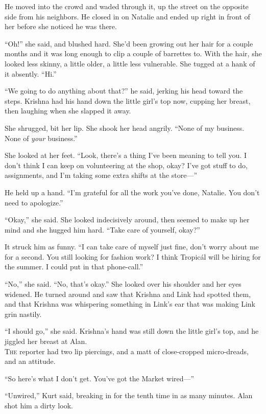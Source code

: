 \documentclass{article}
\begin{document}
He moved into the crowd and waded through it, up the street on the
opposite side from his neighbors.  He closed in on Natalie and ended
up right in front of her before she noticed he was there.

``Oh!'' she said, and blushed hard.  She'd been growing out her hair
for a couple months and it was long enough to clip a couple of
barrettes to.  With the hair, she looked less skinny, a little older,
a little less vulnerable.  She tugged at a hank of it absently. 
``Hi.''

``We going to do anything about that?'' he said, jerking his head
toward the steps.  Krishna had his hand down the little girl's top
now, cupping her breast, then laughing when she slapped it away.

She shrugged, bit her lip.  She shook her head angrily.  ``None of my
business.  None of \textit{your} business.''

She looked at her feet.  ``Look, there's a thing I've been meaning to
tell you.  I don't think I can keep on volunteering at the shop, okay? 
I've got stuff to do, assignments, and I'm taking some extra shifts at
the store---''

He held up a hand.  ``I'm grateful for all the work you've done,
Natalie.  You don't need to apologize.''

``Okay,'' she said.  She looked indecisively around, then seemed to
make up her mind and she hugged him hard.  ``Take care of yourself,
okay?''

It struck him as funny.  ``I can take care of myself just fine, don't
worry about me for a second.  You still looking for fashion work?  I
think Tropic\'{a}l will be hiring for the summer.  I could put in that
phone-call.''

``No,'' she said.  ``No, that's okay.'' She looked over his shoulder
and her eyes widened.  He turned around and saw that Krishna and Link
had spotted them, and that Krishna was whispering something in Link's
ear that was making Link grin nastily.

``I should go,'' she said.  Krishna's hand was still down the little
girl's top, and he jiggled her breast at Alan.
\\
\lettrine[lines=3, lhang=.5, nindent=0pt, findent=2pt]{T}{he} reporter had two lip piercings, and a matt of close-cropped
micro-dreads, and an attitude.

``So here's what I don't get.  You've got the Market wired---''

``Unwired,'' Kurt said, breaking in for the tenth time in as many
minutes.  Alan shot him a dirty look.
\end{document}
